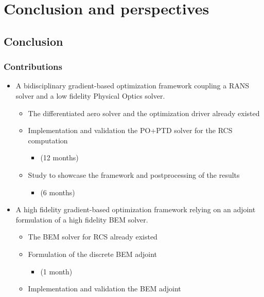 \documentclass[beamer]{standalone}
\begin{document}
\section{Conclusion and perspectives}


\subsection{Conclusion}
\begin{frame}
    \frametitle{Contributions}
    \small
    \begin{itemize}[label=]
        \item A bidisciplinary gradient-based optimization framework coupling a RANS solver and a low fidelity Physical Optics solver.
        \begin{itemize}[label=$\bullet$]
            \item The differentiated aero solver and the optimization driver already existed
            \item Implementation and validation the PO+PTD solver for the RCS computation
            \begin{itemize}
                \item (12 months)
            \end{itemize}
            \item Study to showcase the framework and postprocessing of the results
            \begin{itemize}
                \item (6 months)
            \end{itemize}
        \end{itemize}
        \item A high fidelity gradient-based optimization framework relying on an adjoint formulation of a high fidelity BEM solver.
        \begin{itemize}[label=$\bullet$]
            \item The BEM solver for RCS already existed
            \item Formulation of the discrete BEM adjoint
            \begin{itemize}
                \item (1 month)
            \end{itemize}
            \item Implementation and validation the BEM adjoint
            \begin{itemize}

\end{itemize}
\end{itemize}
\end{itemize}
\end{frame}
\end{document}
